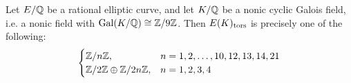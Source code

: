 \begin{frame}[plain]
\end{frame}



\begin{frame}[plain]
\begin{thm}[M.]
Let $E/\mathbb{Q}$ be a rational elliptic curve, and let $K/\mathbb{Q}$ be a nonic cyclic Galois field, i.e. a nonic field with $\operatorname{Gal}(K/\mathbb{Q}) \cong \mathbb{Z}/9\mathbb{Z}$. Then $E(K)_{\text{tors}}$ is precisely one of the following:
	\[
	\begin{cases}
	\mathbb{Z}/n\mathbb{Z}, & n= 1, 2, \ldots, 10, 12, 13, 14, 21 \\
	\mathbb{Z}/2\mathbb{Z} \oplus \mathbb{Z}/2n\mathbb{Z}, & n= 1, 2, 3, 4
	\end{cases}
	\]
\end{thm}
\end{frame}



